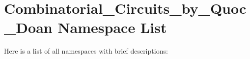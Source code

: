 \section{Combinatorial\_\-Circuits\_\-by\_\-Quoc\_\-Doan Namespace List}
Here is a list of all namespaces with brief descriptions:\begin{CompactList}
\item{}
\end{CompactList}
